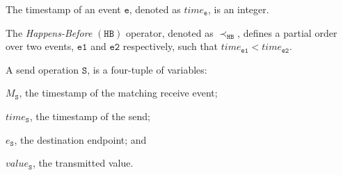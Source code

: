 
\begin{definition}[Timestamp]\label{def:order}
\noindent The timestamp of an event $\mathtt{e}$, denoted as $\mathit{time}_\mathtt{e}$, is an integer.
\end{definition}

\begin{definition}\label{def:happens-before}
The \emph{Happens-Before} $(\mathtt{HB})$ operator, denoted as
$\mathrm{\prec_\mathtt{HB}}$, defines a partial order over two events, $\mathtt{e1}$ and $\mathtt{e2}$ respectively, such that $\mathit{time}_\mathtt{e1} <  \mathit{time}_\mathtt{e2}$. 
\label{def:hb}
\end{definition}


 
\begin{definition}[Send] \label{def:snd}
A send operation $\mathtt{S}$, is a four-tuple of variables:
\begin{compactenum}
\item $M_\mathtt{S}$, the timestamp of the matching receive event;
\item $\mathit{time}_\mathtt{S}$, the timestamp of the send;
\item $e_\mathtt{S}$, the destination endpoint; and
\item $\mathit{value}_\mathtt{S}$, the transmitted value.
\end{compactenum}
\end{definition}

